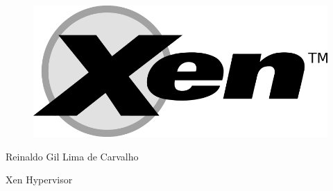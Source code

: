 \thispagestyle{empty}

\begin{center}
  \begin{figure}[H]
    \begin{center}
      \hspace{-1cm}
      \includegraphics[width=0.55\columnwidth]{titlepage}
    \end{center}      
  \end{figure}

  \vskip 2cm

  \hspace{-1cm}
  \begin{minipage}[c]{12cm}
    \begin{center}

{\Huge {}\vskip 0.15cm

{\large Reinaldo Gil Lima de Carvalho}
}
    \end{center}
  \end{minipage}

  \vskip 16cm

  {\Huge Xen Hypervisor}

\end{center}
